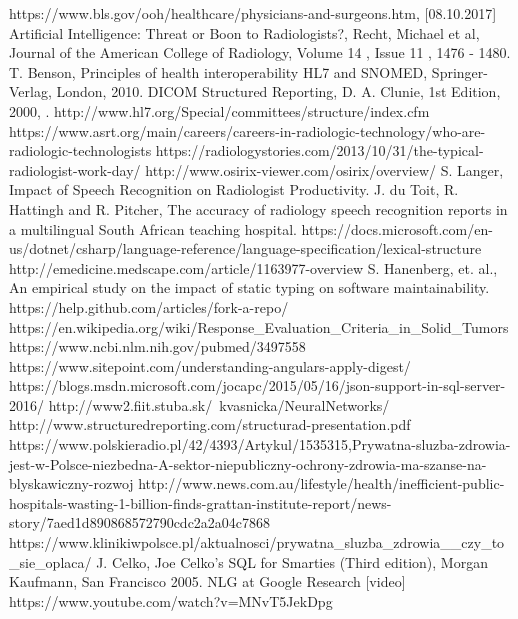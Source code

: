 \documentclass[12pt, twoside, openany]{report}
\theoremstyle{definition}
\begin{document}
\begin{thebibliography}{11}
 https://www.bls.gov/ooh/healthcare/physicians-and-surgeons.htm, [08.10.2017]
 Artificial Intelligence: Threat or Boon to Radiologists?, Recht, Michael et al, Journal of the American College of Radiology, Volume 14 , Issue 11 , 1476 - 1480.
 T. Benson, Principles of health interoperability HL7 and SNOMED,  Springer-Verlag, London, 2010.
 DICOM Structured Reporting, D. A. Clunie, 1st Edition, 2000, .
 http://www.hl7.org/Special/committees/structure/index.cfm 
 https://www.asrt.org/main/careers/careers-in-radiologic-technology/who-are-radiologic-technologists
 https://radiologystories.com/2013/10/31/the-typical-radiologist-work-day/
http://www.osirix-viewer.com/osirix/overview/
S. Langer, Impact of Speech Recognition on Radiologist Productivity.
 J. du Toit, R. Hattingh and R. Pitcher, The accuracy of radiology speech recognition
reports in a multilingual South African teaching hospital.
https://docs.microsoft.com/en-us/dotnet/csharp/language-reference/language-specification/lexical-structure
 http://emedicine.medscape.com/article/1163977-overview
    S. Hanenberg, et. al., An empirical study on the impact of static typing on software maintainability.
 https://help.github.com/articles/fork-a-repo/
https://en.wikipedia.org/wiki/Response\_Evaluation\_Criteria\_in\_Solid\_Tumors
 https://www.ncbi.nlm.nih.gov/pubmed/3497558
 https://www.sitepoint.com/understanding-angulars-apply-digest/
 https://blogs.msdn.microsoft.com/jocapc/2015/05/16/json-support-in-sql-server-2016/
http://www2.fiit.stuba.sk/~kvasnicka/NeuralNetworks/
http://www.structuredreporting.com/structurad-presentation.pdf
 https://www.polskieradio.pl/42/4393/Artykul/1535315,Prywatna-sluzba-zdrowia-jest-w-Polsce-niezbedna-A-sektor-niepubliczny-ochrony-zdrowia-ma-szanse-na-blyskawiczny-rozwoj
http://www.news.com.au/lifestyle/health/inefficient-public-hospitals-wasting-1-billion-finds-grattan-institute-report/news-story/7aed1d890868572790cdc2a2a04c7868
https://www.klinikiwpolsce.pl/aktualnosci/prywatna\_sluzba\_zdrowia\_\_czy\_to\_sie\_oplaca/
J. Celko, Joe Celko's SQL for Smarties (Third edition), Morgan Kaufmann, San Francisco 2005.
 NLG at Google Research [video]
 https://www.youtube.com/watch?v=MNvT5JekDpg
\end{thebibliography}
\end{document}
